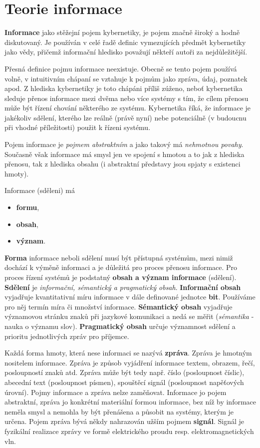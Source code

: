      
  \section{Teorie informace}
    \textbf{Informace} jako stěžejní pojem kybernetiky, je pojem značně široký a hodně diskutovaný. 
    Je používán v celé řadě definic vymezujících předmět kybernetiky jako vědy, přičemž informační 
    hledisko považují někteří autoři za nejdůležitější.
      
    Přesná definice pojmu informace neexistuje. Obecně se tento pojem používá volně, v intuitivním 
    chápaní se vztahuje k pojmům jako zpráva, údaj, poznatek apod. Z hlediska kybernetiky je toto 
    chápáni příliš zúženo, neboť kybernetika sleduje přenos informace mezi dvěma nebo více systémy 
    s tím, že cílem přenosu může být řízení chování některého ze systému. Kybernetika říká, že 
    informace je jakékoliv sdělení, kterého lze reálně (právě nyní) nebe potenciálně (v budoucnu 
    při vhodné příležitosti) použit k řízeni systému.
    
    Pojem informace je \emph{pojmem abstraktním} a jako takový má \emph{nehmotnou povahy}. 
    Současně však informace má smysl jen ve spojení s hmotou a to jak z hlediska přenosu, tak z 
    hlediska obsahu (i abstraktní představy jsou spjaty s existenci hmoty).
    
    Informace (sděleni) má
    \begin{itemize}\addtolength{\itemsep}{-0.4\baselineskip}
      \item \textbf{formu},
      \item \textbf{obsah},
      \item \textbf{význam}.
    \end{itemize}
    \textbf{Forma} informace neboli sdělení musí být přístupná systémům, mezi nimiž dochází k 
    výměně informaci a je důležitá pro proces přenosu informace. Pro proces řízení systémů je 
    podstatný \textbf{obsah a význam informace} (sdělení). \textbf{Sdělení} je \emph{informační, 
    sémantický a pragmatický obsah}. \textbf{Informační obsah} vyjadřuje kvantitativní míru 
    informace v dále definované jednotce \textbf{bit}. Používáme pro něj termín míra či množství 
    informace. \textbf{Sémantický obsah} vyjadřuje významovou stránku znaků při jazykové komunikaci 
    a nedá se měřit (\emph{sémantika} - nauka o významu slov). \textbf{Pragmatický obsah} určuje 
    významnost sdělení a prioritu jednotlivých zpráv pro příjemce.
    
    Každá forma hmoty, která nese informaci se nazývá \textbf{zpráva}. Zpráva je hmotným nositelem 
    informace. Zpráva je způsob vyjádření informace textem, obrazem, řečí, posloupností znaků atd. 
    Zpráva může být tedy např. číslo (posloupnost číslic), abecední text (posloupnost písmen), 
    spouštěcí signál (posloupnost napěťových úrovní). Pojmy informace a zpráva nelze zaměňovat. 
    Informace jo pojem abstraktní, zpráva jo konkrétní materiální formou informace, bez níž by 
    informace neměla smysl a nemohla by být přenášena a působit na systémy, kterým je určena. Pojem 
    zpráva bývá někdy nahrazován užším pojmem \textbf{signál}. Signál je fyzikální realizace zprávy 
    ve formě elektrického proudu resp. elektromagnetických vln.
      
